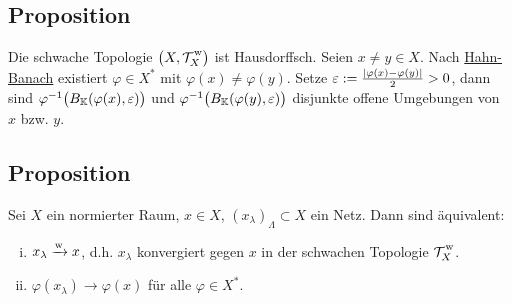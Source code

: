 \subsection[Proposition: Die schwache Topologie ist Hausdorffsch]{Proposition} %
\label{sub:53}
Die schwache Topologie $\enbrace[\big]{X,\weakT{X}}$ ist Hausdorffsch.
Seien $x \not= y \in X$. Nach \hyperref[sub:227]{Hahn-Banach} existiert $\varphi \in X^*$ mit $\varphi(x) \not= \varphi(y)$. Setze 
$\varepsilon := \frac{\abs*{\varphi(x)- \varphi(y)} }{2}>0$, dann sind $\varphi ^{-1} \enbrace[\big]{B_\mathds{K} \enbrace*{\varphi(x),\varepsilon} } $ und
$\varphi ^{-1} \enbrace[\big]{B_\mathds{K} \enbrace*{\varphi(y), \varepsilon}}$ disjunkte offene Umgebungen von $x$ bzw. $y$. \bewende

\subsection[Proposition: Äquivalenz zu schwacher Konvergenz]{Proposition} %
\label{sub:54}
Sei $X$ ein normierter Raum, $x \in X$, $(x_\lambda )_\Lambda \subset X$ ein Netz. Dann sind äquivalent:
\begin{enumerate}[(i)]
	\item $x_\lambda \xrightarrow{\w}  x$, d.h. $x_\lambda$ konvergiert gegen $x$ in der schwachen Topologie $\weakT{X}$.
	\item $\varphi(x_\lambda ) \to \varphi(x)$ für alle $\varphi \in X^*$.
\end{enumerate}
